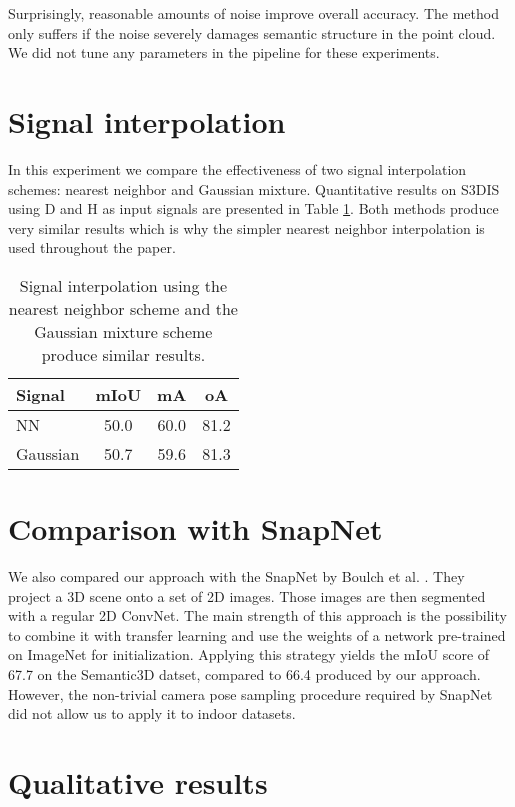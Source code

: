 \documentclass[10pt,twocolumn,letterpaper]{article}
\newcommand{\ra}[1]{\renewcommand{\arraystretch}{#1}}
\begin{document}
Surprisingly, reasonable amounts of noise improve overall accuracy. The method only suffers if the noise severely damages semantic structure in the point cloud.
We did not tune any parameters in the pipeline for these experiments.
 
\section{Signal interpolation}
\label{sec:interpolation}
In this experiment we compare the effectiveness of two signal interpolation schemes: nearest neighbor and Gaussian mixture.
Quantitative results on S3DIS using D and H as input signals are presented in Table \ref{tbl:sig_int}.
Both methods produce very similar results which is why the simpler nearest neighbor interpolation is used throughout the paper.

\begin{table}[H]
\small
\centering
	\setlength{\tabcolsep}{5mm}
	\ra{0.9}
	\begin{tabular}{@{}l c c c@{}}
	\toprule
	 Signal & mIoU & mA & oA\\
	\midrule
	 NN & 50.0 & 60.0 & 81.2\\
	 Gaussian & 50.7 & 59.6 & 81.3\\
	\bottomrule
	\end{tabular}
\vspace{1mm}
\caption{Signal interpolation using the nearest neighbor scheme and the Gaussian mixture scheme produce similar results.}
\label{tbl:sig_int}
\vspace{-2mm}
\end{table} 
\section{Comparison with SnapNet}
\label{sec:snapnet}
We also compared our approach with the SnapNet by Boulch et al. \cite{boulch17}.
They project a 3D scene onto a set of 2D images.
Those images are then segmented with a regular 2D ConvNet.
The main strength of this approach is the possibility to combine it with transfer learning and use the weights of a network pre-trained on ImageNet for initialization.
Applying this strategy yields the mIoU score of 67.7 on the Semantic3D datset, compared to 66.4 produced by our approach.
However, the non-trivial camera pose sampling procedure required by SnapNet did not allow us to apply it to indoor datasets. 
\section{Qualitative results}
\label{sec:qualitative}
\end{document}
